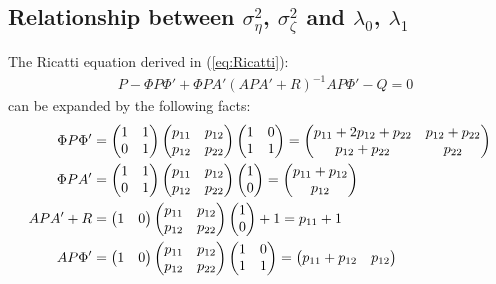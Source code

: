 \subsection{Relationship between $\sigma_\eta^2$, $\sigma_\zeta^2$ and $\lambda_0$, $\lambda_1$}
The Ricatti equation derived in (\ref{eq:Ricatti}):
\begin{equation}
\begin{split}
&P - \Phi P \Phi' +\Phi PA'(APA'+R)^{-1}AP \Phi'-Q = 0 
\end{split}
\end{equation}
can be expanded by the following facts:
\begin{equation}
\begin{split}
\Phi P \Phi' &= \begin{pmatrix}1 & 1\\0 & 1\end{pmatrix} \begin{pmatrix}p_{11} & p_{12}\\p_{12} & p_{22}\end{pmatrix} \begin{pmatrix}1 & 0\\1 & 1\end{pmatrix} = \begin{pmatrix}p_{11} + 2p_{12}+p_{22}& p_{12}+p_{22}\\p_{12}+p_{22} & p_{22}\end{pmatrix} \\
\Phi PA' &= \begin{pmatrix}1 & 1\\0 & 1\end{pmatrix} \begin{pmatrix}p_{11} & p_{12}\\p_{12} & p_{22}\end{pmatrix} \colvec{1}{0} = \begin{pmatrix}p_{11} +p_{12}\\p_{12}\end{pmatrix} \\
APA' + R &= \begin{pmatrix}1 & 0\end{pmatrix} \begin{pmatrix}p_{11} & p_{12}\\p_{12} & p_{22}\end{pmatrix}  \colvec{1}{0} + 1 = p_{11} + 1 \\
AP\Phi' &= \begin{pmatrix}1 & 0\end{pmatrix} \begin{pmatrix}p_{11} & p_{12}\\p_{12} & p_{22}\end{pmatrix} \begin{pmatrix}1 & 0\\1 & 1\end{pmatrix} = \begin{pmatrix}p_{11} +p_{12} & p_{12}\end{pmatrix} 
\end{split}
\end{equation}

